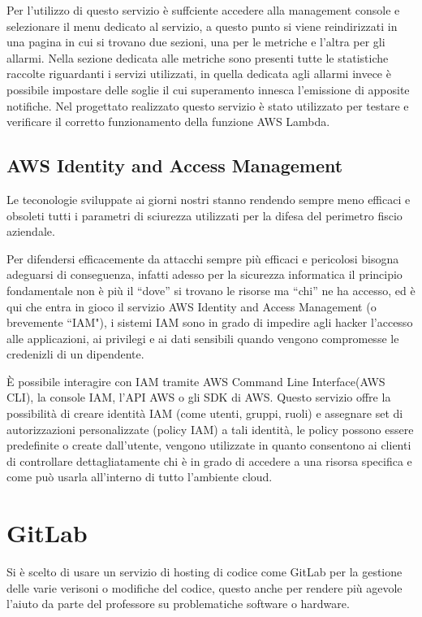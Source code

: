 Per l'utilizzo di questo servizio è suffciente accedere alla management console e selezionare il menu dedicato al servizio, a questo punto si viene reindirizzati in una
pagina in cui si trovano due sezioni, una per le metriche e l’altra per gli allarmi. 
Nella sezione dedicata alle metriche sono presenti tutte le statistiche raccolte riguardanti i servizi utilizzati, in quella dedicata agli allarmi 
invece è possibile impostare delle soglie il cui superamento innesca l'emissione di apposite notifiche.
Nel progettato realizzato questo servizio è stato utilizzato per testare e verificare il corretto funzionamento della funzione AWS Lambda.


\subsection{AWS Identity and Access Management}
\label{sec:iam}
Le teconologie sviluppate ai giorni nostri stanno rendendo sempre meno efficaci e obsoleti tutti i parametri di sciurezza utilizzati per la difesa del 
perimetro fiscio aziendale. 

Per difendersi efficacemente da attacchi sempre più efficaci e pericolosi bisogna adeguarsi di conseguenza, infatti adesso per la 
sicurezza informatica il principio fondamentale non è più il ``dove'' si trovano le risorse ma ``chi'' ne ha accesso, ed è qui che entra in gioco il servizio AWS 
Identity and Access Management (o brevemente ``IAM"), i sistemi IAM sono in grado di impedire agli hacker l'accesso alle applicazioni, ai privilegi e ai dati sensibili
quando vengono compromesse le credenizli di un dipendente.

È possibile interagire con IAM tramite AWS Command Line Interface(AWS CLI), la console IAM, l'API AWS o gli SDK di AWS. Questo servizio offre la possibilità di creare 
identità IAM (come utenti, gruppi, ruoli) e assegnare set di autorizzazioni personalizzate (policy IAM) a tali identità, le policy possono essere predefinite o create 
dall'utente, vengono utilizzate in quanto consentono ai clienti di controllare dettagliatamente chi è in grado di accedere a una risorsa specifica e come può usarla 
all'interno di tutto l'ambiente cloud.


\section{GitLab}
\label{sec:git}
Si è scelto di usare un servizio di hosting di codice come GitLab per la gestione delle varie verisoni o modifiche del codice, questo anche per rendere più agevole 
l'aiuto da parte del professore su problematiche software o hardware.

